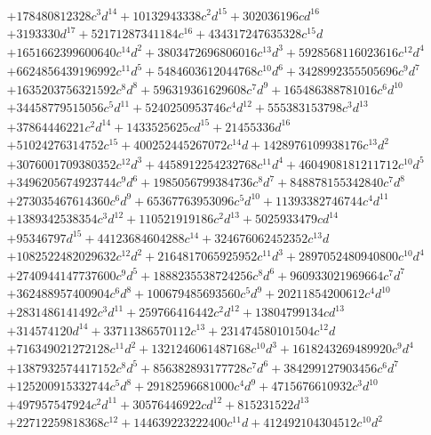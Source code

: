 {\begin{align*}
&+178480812328c^{3}d^{14}+10132943338c^{2}d^{15}+302036196cd^{16}\\
&+3193330d^{17}+52171287341184c^{16}+434317247635328c^{15}d\\
&+1651662399600640c^{14}d^{2}+3803472696806016c^{13}d^{3}+5928568116023616c^{12}d^{4}\\
&+6624856439196992c^{11}d^{5}+5484603612044768c^{10}d^{6}+3428992355505696c^{9}d^{7}\\
&+1635203756321592c^{8}d^{8}+596319361629608c^{7}d^{9}+165486388781016c^{6}d^{10}\\
&+34458779515056c^{5}d^{11}+5240250953746c^{4}d^{12}+555383153798c^{3}d^{13}\\
&+37864446221c^{2}d^{14}+1433525625cd^{15}+21455336d^{16}\\
&+51024276314752c^{15}+400252445267072c^{14}d+1428976109938176c^{13}d^{2}\\
&+3076001709380352c^{12}d^{3}+4458912254232768c^{11}d^{4}+4604908181211712c^{10}d^{5}\\
&+3496205674923744c^{9}d^{6}+1985056799384736c^{8}d^{7}+848878155342840c^{7}d^{8}\\
&+273035467614360c^{6}d^{9}+65367763953096c^{5}d^{10}+11393382746744c^{4}d^{11}\\
&+1389342538354c^{3}d^{12}+110521919186c^{2}d^{13}+5025933479cd^{14}\\
&+95346797d^{15}+44123684604288c^{14}+324676062452352c^{13}d\\
&+1082522482029632c^{12}d^{2}+2164817065925952c^{11}d^{3}+2897052480940800c^{10}d^{4}\\
&+2740944147737600c^{9}d^{5}+1888235538724256c^{8}d^{6}+960933021969664c^{7}d^{7}\\
&+362488957400904c^{6}d^{8}+100679485693560c^{5}d^{9}+20211854200612c^{4}d^{10}\\
&+2831486141492c^{3}d^{11}+259766416442c^{2}d^{12}+13804799134cd^{13}\\
&+314574120d^{14}+33711386570112c^{13}+231474580101504c^{12}d\\
&+716349021272128c^{11}d^{2}+1321246061487168c^{10}d^{3}+1618243269489920c^{9}d^{4}\\
&+1387932574417152c^{8}d^{5}+856382893177728c^{7}d^{6}+384299127903456c^{6}d^{7}\\
&+125200915332744c^{5}d^{8}+29182596681000c^{4}d^{9}+4715676610932c^{3}d^{10}\\
&+497957547924c^{2}d^{11}+30576446922cd^{12}+815231522d^{13}\\
&+22712259818368c^{12}+144639223222400c^{11}d+412492104304512c^{10}d^{2}\\

\end{align*}}
